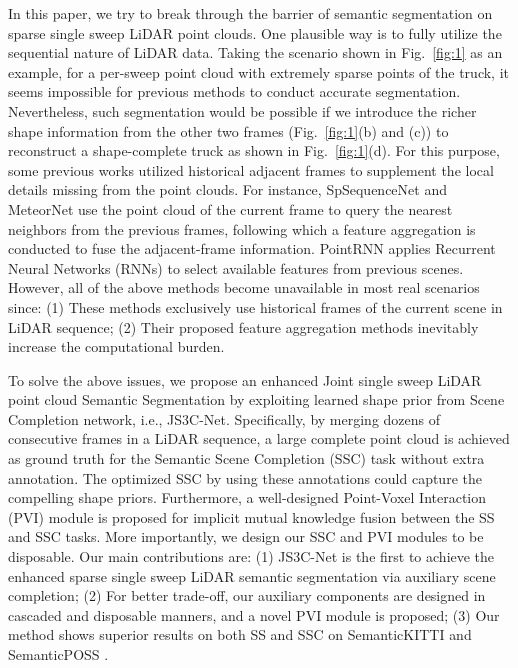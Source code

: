 \documentclass[11pt,twocolumn]{article}
\begin{document}
In this paper, we try to break through the barrier of semantic segmentation on sparse single sweep LiDAR point clouds. One plausible way is to fully utilize the sequential nature of LiDAR data. Taking the scenario shown in Fig.~\ref{fig:1} as an example, for a per-sweep point cloud with extremely sparse points of the truck, it seems impossible for previous methods to conduct accurate segmentation. Nevertheless, such segmentation would be possible if we introduce the richer shape information from the other two frames (Fig.~\ref{fig:1}(b) and (c)) to reconstruct a shape-complete truck as shown in Fig.~\ref{fig:1}(d). For this purpose, some previous works utilized historical adjacent frames to supplement the local details missing from the point clouds. For instance, SpSequenceNet \cite{shi2020} and MeteorNet \cite{liu2019} use the point cloud of the current frame to query the nearest neighbors from the previous frames, following which a feature aggregation is conducted to fuse the adjacent-frame information. PointRNN \cite{fan2019} applies Recurrent Neural Networks (RNNs) to select available features from previous scenes. However, all of the above methods become unavailable in most real scenarios since: (1) These methods exclusively use historical frames of the current scene in LiDAR sequence; (2) Their proposed feature aggregation methods inevitably increase the computational burden.

To solve the above issues, we propose an enhanced Joint single sweep LiDAR point cloud Semantic Segmentation by exploiting learned shape prior from Scene Completion network, i.e., JS3C-Net. Specifically, by merging dozens of consecutive frames in a LiDAR sequence, a large complete point cloud is achieved as ground truth for the Semantic Scene Completion (SSC) task without extra annotation. The optimized SSC by using these annotations could capture the compelling shape priors. Furthermore, a well-designed Point-Voxel Interaction (PVI) module is proposed for implicit mutual knowledge fusion between the SS and SSC tasks. More importantly, we design our SSC and PVI modules to be disposable. Our main contributions are: (1) JS3C-Net is the first to achieve the enhanced sparse single sweep LiDAR semantic segmentation via auxiliary scene completion; (2) For better trade-off, our auxiliary components are designed in cascaded and disposable manners, and a novel PVI module is proposed; (3) Our method shows superior results on both SS and SSC on SemanticKITTI \cite{kendall2018} and SemanticPOSS \cite{pan2020}.
\end{document}
